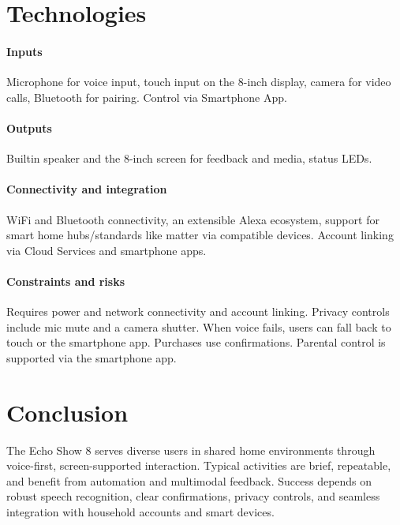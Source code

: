 \documentclass[a4paper,10pt]{article}
\begin{document}
    \section{Technologies}\label{sec:technologies}

    \paragraph{Inputs}
    Microphone for voice input, touch input on the 8-inch display, camera for video calls, Bluetooth for pairing.
    Control via Smartphone App.

    \paragraph{Outputs}
    Builtin speaker and the 8-inch screen for feedback and media, status LEDs.

    \paragraph{Connectivity and integration}
    Wi\-Fi and Bluetooth connectivity, an extensible Alexa ecosystem, support for smart home hubs/standards like matter via compatible devices.
    Account linking via Cloud Services and smartphone apps.

    \paragraph{Constraints and risks}
    Requires power and network connectivity and account linking.
    Privacy controls include mic mute and a camera shutter.
    When voice fails, users can fall back to touch or the smartphone app.
    Purchases use confirmations.
    Parental control is supported via the smartphone app.


    \section{Conclusion}\label{sec:conclusion}
    The Echo Show 8 serves diverse users in shared home environments through voice-first, screen-supported interaction.
    Typical activities are brief, repeatable, and benefit from automation and multimodal feedback.
    Success depends on robust speech recognition, clear confirmations, privacy controls, and seamless integration with household accounts and smart devices.
\end{document}
